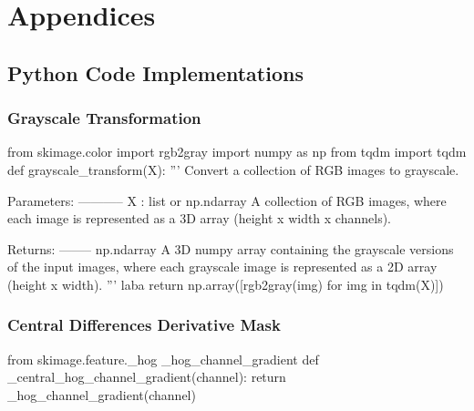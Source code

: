 \appendix
\section{Appendices}
\subsection{Python Code Implementations}
\subsubsection{Grayscale Transformation}\label{appendix:grayscale}
\begin{pythoncode}
from skimage.color import rgb2gray
import numpy as np
from tqdm import tqdm
def grayscale_transform(X):
    '''
    Convert a collection of RGB images to grayscale.

    Parameters:
    -----------
    X : list or np.ndarray
        A collection of RGB images, where each image is represented as a 3D array (height x width x channels).

    Returns:
    --------
    np.ndarray
        A 3D numpy array containing the grayscale versions of the input images, 
        where each grayscale image is represented as a 2D array (height x width).
    '''
    laba
    return np.array([rgb2gray(img) for img in tqdm(X)])
\end{pythoncode}
\subsubsection{Central Differences Derivative Mask}
\begin{pythoncode}
from skimage.feature._hog _hog_channel_gradient
def _central_hog_channel_gradient(channel):
    return _hog_channel_gradient(channel)
\end{pythoncode}

